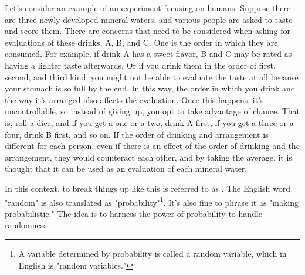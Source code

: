 \documentclass{ltjbook}
\begin{document}
Let's consider an example of an experiment focusing on humans. Suppose there are three newly developed mineral waters, and various people are asked to taste and score them. There are concerns that need to be considered when asking for evaluations of these drinks, A, B, and C. One is the order in which they are consumed. For example, if drink A has a sweet flavor, B and C may be rated as having a lighter taste afterwards. Or if you drink them in the order of first, second, and third kind, you might not be able to evaluate the taste at all because your stomach is so full by the end. In this way, the order in which you drink and the way it's arranged also affects the evaluation. Once this happens, it's uncontrollable, so instead of giving up, you opt to take advantage of chance. That is, roll a dice, and if you get a one or a two, drink A first, if you get a three or a four, drink B first, and so on. If the order of drinking and arrangement is different for each person, even if there is an effect of the order of drinking and the arrangement, they would counteract each other, and by taking the average, it is thought that it can be used as an evaluation of each mineral water.

In this context, to break things up like this is referred to as . The English word "random" is also translated as "probability"\footnote{A variable determined by probability is called a random variable, which in English is "random variables."}. It's also fine to phrase it as "making probabilistic." The idea is to harness the power of probability to handle randomness.
\end{document}
